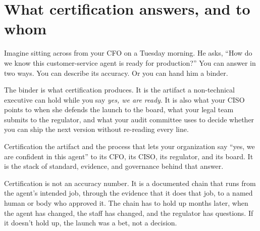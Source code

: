 \label{ch:50-certification-17-framework}

\starttwocol

\section{What certification answers, and to whom}

Imagine sitting across from your CFO on a Tuesday morning. He asks, ``How do we know this customer-service agent is ready for production?'' You can answer in two ways. You can describe its accuracy. Or you can hand him a binder.

The binder is what certification produces. It is the artifact a non-technical executive can hold while you say \textit{yes, we are ready}. It is also what your CISO points to when she defends the launch to the board, what your legal team submits to the regulator, and what your audit committee uses to decide whether you can ship the next version without re-reading every line.

\begin{TNdefinition}{Certification} the artifact and the process that lets your organization say ``yes, we are confident in this agent'' to its CFO, its CISO, its regulator, and its board. It is the stack of standard, evidence, and governance behind that answer. \end{TNdefinition}

Certification is not an accuracy number. It is a documented chain that runs from the agent's intended job, through the evidence that it does that job, to a named human or body who approved it. The chain has to hold up months later, when the agent has changed, the staff has changed, and the regulator has questions. If it doesn't hold up, the launch was a bet, not a decision.

